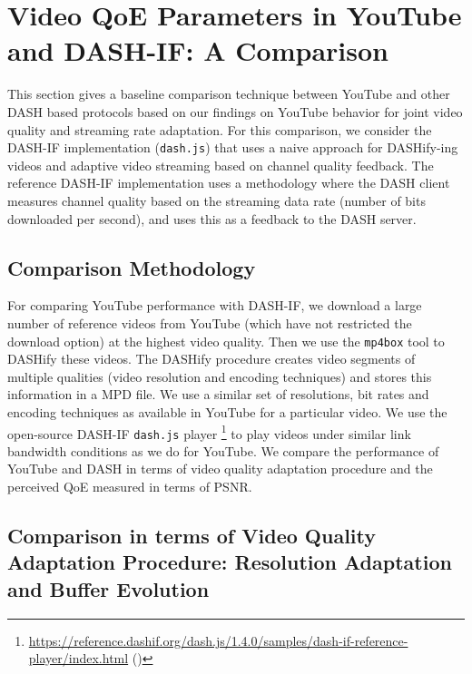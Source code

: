 \section{Video QoE Parameters in YouTube and DASH-IF: A Comparison}
\label{sec:open-dash}

This section gives a baseline comparison technique between YouTube and other DASH based protocols based on our findings on YouTube behavior for joint video quality and streaming rate adaptation. For this comparison, we consider the \ac{DASH-IF} implementation (\texttt{dash.js}) that uses a naive approach for DASHify-ing videos and adaptive video streaming based on channel quality feedback. The reference \ac{DASH-IF} implementation uses a methodology where the \ac{DASH} client measures channel quality based on the streaming data rate (number of bits downloaded per second), and uses this as a feedback to the \ac{DASH} server.

\subsection{Comparison Methodology}

For comparing YouTube performance with \ac{DASH-IF}, we download a large number of reference videos from YouTube (which have not restricted the download option) at the highest video quality. Then we use the \texttt{mp4box} tool to DASHify these videos. The DASHify procedure creates video segments of multiple qualities (video resolution and encoding techniques) and stores this information in a \ac{MPD} file. We use a similar set of resolutions, bit rates and encoding techniques as available in YouTube for a particular video. We use the open-source \ac{DASH-IF} \texttt{dash.js} player \footnote{\url{https://reference.dashif.org/dash.js/1.4.0/samples/dash-if-reference-player/index.html} (\lastaccessedtoday)} to play videos under similar link bandwidth conditions as we do for YouTube. We compare the performance of YouTube and \ac{DASH} in terms of video quality adaptation procedure and the perceived \ac{QoE} measured in terms of \ac{PSNR}.

\subsection{Comparison in terms of Video Quality Adaptation Procedure: Resolution Adaptation and Buffer Evolution}

